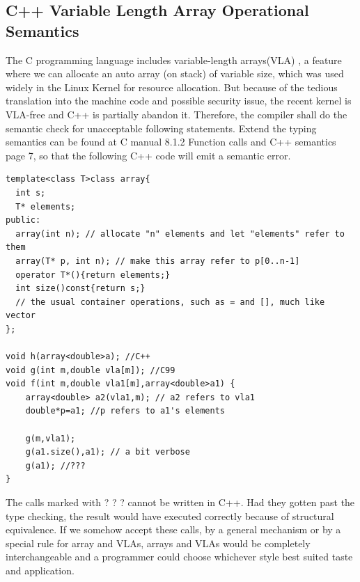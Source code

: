 \documentclass[a4paper]{exam}
\theoremstyle{definition}
\begin{document}
\subsection{C++ Variable Length Array Operational Semantics}
The C programming language\cite{openstd} includes variable-length arrays(VLA) \cite{makinglessdangerous}, a feature where we can allocate an auto array (on stack) of variable size, which was used widely in the Linux Kernel for resource allocation. But because of the tedious translation into the machine code and possible security issue, the recent kernel is VLA-free and C++ is partially abandon it. Therefore, the compiler shall do the semantic check for unacceptable following statements. Extend the typing semantics can be found at C manual 8.1.2 Function calls\cite{cfuncall} and C++ semantics page 7\cite{cs230lec06}, so that the following C++ code will emit a semantic error.
\begin{verbatim}
template<class T>class array{ 
  int s;
  T* elements; 
public:
  array(int n); // allocate "n" elements and let "elements" refer to them 
  array(T* p, int n); // make this array refer to p[0..n-1]
  operator T*(){return elements;}
  int size()const{return s;} 
  // the usual container operations, such as = and [], much like vector 
};

void h(array<double>a); //C++
void g(int m,double vla[m]); //C99
void f(int m,double vla1[m],array<double>a1) {
    array<double> a2(vla1,m); // a2 refers to vla1 
    double*p=a1; //p refers to a1's elements

    g(m,vla1);
    g(a1.size(),a1); // a bit verbose 
    g(a1); //???
}
\end{verbatim}
The calls marked with ? ? ? cannot be written in C++. Had they gotten past the type checking, the result would have executed correctly because of structural equivalence. If we somehow accept these calls, by a general mechanism or by a special rule for array and VLAs, arrays and VLAs would be completely interchangeable and a programmer could choose whichever style best suited taste and application.
\end{document}
